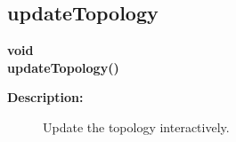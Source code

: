 \subsection{updateTopology}
 
\newlength{\CompositeSurfaceIncludeArgIndent}
\begin{flushleft} \textbf{%
void  \\ 
\settowidth{\CompositeSurfaceIncludeArgIndent}{updateTopology(}%
updateTopology()
}\end{flushleft}
\begin{description}
\item[{\bf Description:}] 
    Update the topology interactively.
\end{description}
